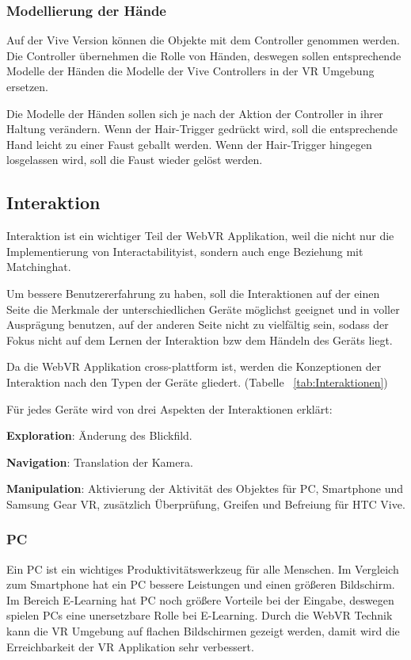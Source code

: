    \subsubsection{Modellierung der Hände}
   Auf der Vive Version können die Objekte mit dem Controller genommen werden. Die Controller übernehmen die Rolle von Händen, deswegen sollen entsprechende Modelle der Händen die Modelle der Vive Controllers in der VR Umgebung ersetzen.
   
   Die Modelle der Händen sollen sich je nach der Aktion der Controller in ihrer Haltung verändern. Wenn der Hair-Trigger gedrückt wird, soll die entsprechende Hand leicht zu einer Faust geballt werden. Wenn der Hair-Trigger hingegen losgelassen wird, soll die Faust wieder gelöst werden.

 \subsection{Interaktion}
 Interaktion ist ein wichtiger Teil der WebVR Applikation, weil die nicht nur die Implementierung von \glqq Interactability\grqq ist, sondern auch enge Beziehung mit \glqq Matching\grqq hat.
 
 Um bessere Benutzererfahrung zu haben, soll die Interaktionen auf der einen Seite die Merkmale der unterschiedlichen Geräte möglichst geeignet und in voller Ausprägung benutzen, auf der anderen Seite nicht zu vielfältig sein, sodass der Fokus nicht auf dem Lernen der Interaktion bzw dem Händeln des Geräts liegt. 
 
 Da die WebVR Applikation cross-plattform ist, werden die Konzeptionen der Interaktion nach den Typen der Geräte gliedert. (Tabelle ~\ref{tab:Interaktionen})

 Für jedes Geräte wird von drei Aspekten der Interaktionen erklärt:
 
 \textbf{Exploration}: Änderung des Blickfild.
 
 \textbf{Navigation}: Translation der Kamera.
 
 \textbf{Manipulation}: Aktivierung der Aktivität des Objektes für PC, Smartphone und Samsung Gear VR, zusätzlich Überprüfung, Greifen und Befreiung für HTC Vive.

 \subsubsection{PC}
 Ein PC ist ein wichtiges Produktivitätswerkzeug für alle Menschen. Im Vergleich zum Smartphone hat ein PC bessere Leistungen und einen größeren Bildschirm. Im Bereich E-Learning hat PC noch größere Vorteile bei der Eingabe, deswegen spielen PCs eine unersetzbare Rolle bei E-Learning. Durch die WebVR Technik kann die VR Umgebung auf flachen Bildschirmen gezeigt werden, damit wird die Erreichbarkeit der VR Applikation sehr verbessert. 
  
